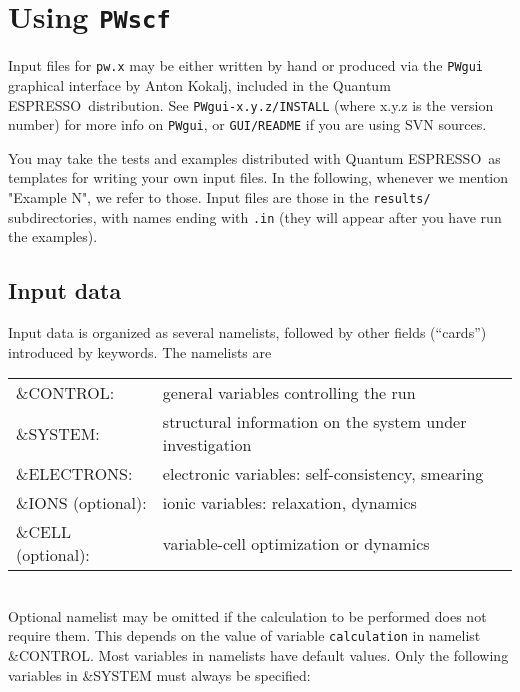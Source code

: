 \documentclass[12pt,a4paper]{article}
\def\PWscf{\texttt{PWscf}}
\def\qe{{\sc Quantum ESPRESSO}}
\begin{document}
\newpage\section{Using \PWscf}

Input files for \texttt{pw.x} may be either written by hand 
or produced via the \texttt{PWgui} graphical interface by Anton Kokalj, 
included in the \qe\ distribution. See \texttt{PWgui-x.y.z/INSTALL}
(where x.y.z is the version number) for more info on \texttt{PWgui}, 
or \texttt{GUI/README} if you are using SVN sources.
    
You may take the tests and examples distributed 
with \qe\ as templates for writing your own input files.
In the following, whenever we mention "Example N", we refer to those. 
Input files are those in the \texttt{results/} subdirectories, with names ending
with \texttt{.in} 
(they will appear after you have run the examples).

\subsection{Input data}

Input data 
is organized as several namelists, followed by other fields (``cards'')
introduced by keywords. The namelists are

\begin{tabular}{ll}
      \&CONTROL:& general variables controlling the run\\
      \&SYSTEM: &structural information on the system under investigation\\
      \&ELECTRONS: &electronic variables: self-consistency, smearing\\
      \&IONS (optional): &ionic variables: relaxation, dynamics\\
      \&CELL (optional): &variable-cell optimization or dynamics\\
\end{tabular}    \\
Optional namelist may be omitted if the calculation to be performed
does not require them. This depends on the value of variable 
\texttt{calculation}
in namelist \&CONTROL. Most variables in namelists have default values. Only
the following variables in \&SYSTEM must always be specified:
\end{document}

